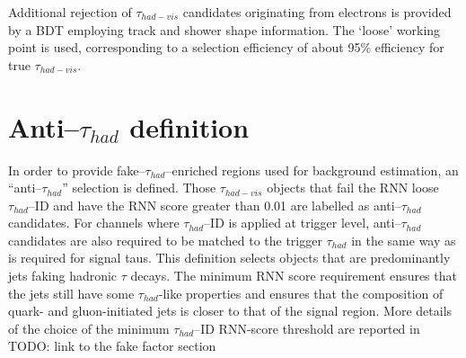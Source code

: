 Additional rejection of $\tau_{had-vis}$ candidates originating 
from electrons is provided by a BDT employing track
and shower shape information. 
The `loose' working point is used, corresponding to a selection efficiency
of about 95\% efficiency for true $\tau_{had-vis}$.

\section{Anti--$\tau_{had}$ definition}
In order to provide fake--$\tau_{had}$--enriched regions used for background estimation, 
an ``anti--$\tau_{had}$'' selection is defined. 
Those $\tau_{had-vis}$ objects that fail the RNN loose $\tau_{had}$--ID 
and have the RNN score greater than 0.01 are labelled as anti--$\tau_{had}$ candidates. 
For channels where $\tau_{had}$--ID is applied at trigger level, anti--$\tau_{had}$
candidates are also required to be matched to the trigger $\tau_{had}$ in 
the same way as is required for signal taus.
This definition selects objects that are 
predominantly jets faking hadronic $\tau$ decays. 
The minimum RNN score requirement ensures that 
the jets still have some $\tau_{had}$-like properties 
and ensures that the composition of quark- and gluon-initiated jets 
is closer to that of the signal region.
More details of the choice of the minimum $\tau_{had}$--ID RNN-score
threshold are reported in TODO: link to the fake factor section
